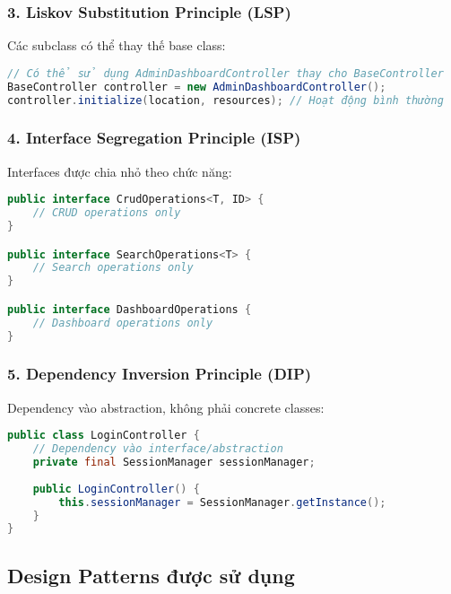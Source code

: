 \documentclass[12pt,a4paper]{article}
\begin{document}
\subsubsection{3. Liskov Substitution Principle (LSP)}

Các subclass có thể thay thế base class:

\begin{lstlisting}[language=Java, caption=Ví dụ về LSP với BaseController]
// Có thể sử dụng AdminDashboardController thay cho BaseController
BaseController controller = new AdminDashboardController();
controller.initialize(location, resources); // Hoạt động bình thường
\end{lstlisting}

\subsubsection{4. Interface Segregation Principle (ISP)}

Interfaces được chia nhỏ theo chức năng:

\begin{lstlisting}[language=Java, caption=Ví dụ về ISP với các interface riêng biệt]
public interface CrudOperations<T, ID> {
    // CRUD operations only
}

public interface SearchOperations<T> {
    // Search operations only
}

public interface DashboardOperations {
    // Dashboard operations only
}
\end{lstlisting}

\subsubsection{5. Dependency Inversion Principle (DIP)}

Dependency vào abstraction, không phải concrete classes:

\begin{lstlisting}[language=Java, caption=Ví dụ về DIP với SessionManager]
public class LoginController {
    // Dependency vào interface/abstraction
    private final SessionManager sessionManager;
    
    public LoginController() {
        this.sessionManager = SessionManager.getInstance();
    }
}
\end{lstlisting}

\subsection{Design Patterns được sử dụng}
\end{document}
